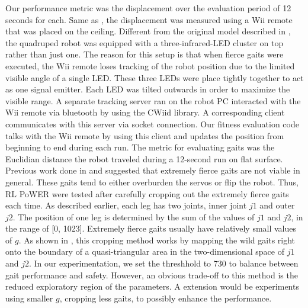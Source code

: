 Our performance metric was the displacement over the evaluation period of 12 seconds
for each. Same as \cite{yosinski2011evolving-robot-gaits}, the displacement was
measured using a Wii remote that was placed on the ceiling. Different
from the original model described in \cite{yosinski2011evolving-robot-gaits}, the quadruped robot was
equipped with a three-infrared-LED cluster on top rather than just
one. The reason for this setup is that when fierce gaits were
executed, the Wii remote loses tracking of the robot position due to
the limited visible angle of a single LED.  These three LEDs were
place tightly together to act as one signal emitter. Each LED was
tilted outwards in order to maximize the visible range. A
separate tracking server ran on the robot PC interacted with the Wii
remote via bluetooth by using the CWiid library.  A corresponding
client communicates with this server via socket connection. Our
fitness evaluation code talks with the Wii remote by using this client
and updates the position from beginning to end during each run. The
metric for evaluating gaits was the Euclidian distance the robot
traveled during a 12-second run on flat surface. Previous work done in
\cite{yosinski2011evolving-robot-gaits} and \cite{clune2009evolving-coordinated-quadruped} suggested that extremely fierce gaits are not viable in
general. These gaits tend to either overburden the servos or flip the
robot. Thus, RL PoWER were tested after carefully cropping out the
extremely fierce gaits each time. As described earlier, each leg has
two joints, inner joint $j1$ and outer $j2$. The position of one leg is
determined by the sum of the values of $j1$ and $j2$, in the range of [0, 1023]. Extremely fierce
gaits usually have relatively small values of $g$. As shown in , this cropping method works
by mapping the wild gaits right onto the boundary of a quasi-triangular area in
the two-dimensional space of $j1$ and $j2$. In our experimentation, we set the threshhold to 730 to balance between gait performance and safety. However, an obvious trade-off to this method is the reduced exploratory region of the parameters. A extension would be experiments using smaller $g$, cropping less gaits, to possibly enhance the performance. 


